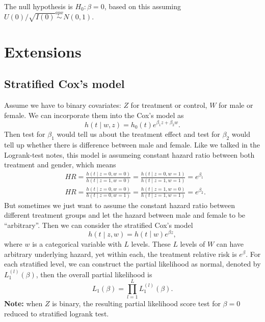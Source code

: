 \documentclass[a4paper,12pt]{article}
\begin{document}
The null hypothesis is $H_0:\beta = 0$, based on this assuming $U\left(0\right) / \sqrt{I\left(0\right)} \overset{apx}{\sim}N\left(0, 1\right)$.

\section{Extensions}
\label{sec:extensions}

\subsection{Stratified Cox's model}
\label{sec:strat-coxs-model}

Assume we have to binary covariates: $Z$ for treatment or control, $W$ for male or female. We can incorporate them into the Cox's model as
\[
  h\left(t\middle|w, z\right) = h_0\left(t\right)e^{\beta_1 z + \beta_2 w}
  .
\]
Then test for $\beta_1$ would tell us about the treatment effect and test for $\beta_2$ would tell up whether there is difference between male and female. Like we talked in the Logrank-test notes, this model is assumeing constant hazard ratio between both treatment and gender, which means
\[
  \begin{aligned}
    & HR
    = \frac{h\left(t\middle|z = 0, w = 0\right)}{h\left(t\middle|z = 1, w = 0\right)}
    = \frac{h\left(t\middle|z = 0, w = 1\right)}{h\left(t\middle|z = 1, w = 1\right)}
    = e^{\beta_1}    \\
    & HR
    = \frac{h\left(t\middle|z = 0, w = 0\right)}{h\left(t\middle|z = 0, w = 1\right)}
    = \frac{h\left(t\middle|z = 1, w = 0\right)}{h\left(t\middle|z = 1, w = 1\right)}
    = e^{\beta_2}
    .
  \end{aligned}
\]
But sometimes we just want to assume the constant hazard ratio between different treatment groups and let the hazard between male and female to be ``arbitrary''. Then we can consider the stratified Cox's model
\begin{equation}
  \label{eq:stratified_cox_model}
  h\left(t\middle|z, w\right)
  = h\left(t\middle|w\right)
  e^{\beta z}
  ,
\end{equation}
where $w$ is a categorical variable with $L$ levels. These $L$ levels of $W$ can have arbitrary underlying hazard, yet within each, the treatment relative risk is $e^{\beta}$. For each stratified level, we can construct the partial likelihood as normal, denoted by $L_1^{\left(l\right)}\left(\beta\right)$, then the overall partial likelihood is
\begin{equation}
  \label{eq:overall_partial_likelihood}
  L_1\left(\beta\right)
  = \prod\limits_{l = 1}^LL_1^{\left(l\right)}\left(\beta\right)
  .
\end{equation}
\textbf{Note: } when $Z$ is binary, the resulting partial likelihood score test for $\beta = 0$ reduced to stratified logrank test.
\end{document}
